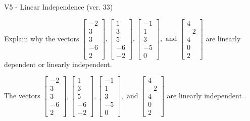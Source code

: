 \begin{exercise}
  \begin{exerciseTitle}V5 - Linear Independence (ver. 33)\end{exerciseTitle}
  \begin{exerciseStatement}
    Explain why the vectors \(\left[\begin{array}{r}
-2 \\
3 \\
3 \\
-6 \\
2
\end{array}\right] , \left[\begin{array}{r}
1 \\
3 \\
5 \\
-6 \\
-2
\end{array}\right] , \left[\begin{array}{r}
-1 \\
1 \\
3 \\
-5 \\
0
\end{array}\right] , \text{ and } \left[\begin{array}{r}
4 \\
-2 \\
4 \\
0 \\
2
\end{array}\right]\) are linearly dependent or linearly independent.	


  \end{exerciseStatement}
  \begin{exerciseAnswer}
   The vectors \(\left[\begin{array}{r}
-2 \\
3 \\
3 \\
-6 \\
2
\end{array}\right] , \left[\begin{array}{r}
1 \\
3 \\
5 \\
-6 \\
-2
\end{array}\right] , \left[\begin{array}{r}
-1 \\
1 \\
3 \\
-5 \\
0
\end{array}\right] , \text{ and } \left[\begin{array}{r}
4 \\
-2 \\
4 \\
0 \\
2
\end{array}\right]\) are 
  	 linearly independent  .
  


  \end{exerciseAnswer}
\end{exercise}